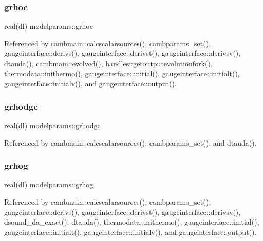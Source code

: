 \mbox{\label{namespacemodelparams_ae9f905639d83dffafeac77f6c039c632}} 
\subsubsection{\texorpdfstring{grhoc}{grhoc}}
{\footnotesize\ttfamily real(dl) modelparams\+::grhoc}



Referenced by cambmain\+::calcscalarsources(), cambparams\+\_\+set(), gaugeinterface\+::derivs(), gaugeinterface\+::derivst(), gaugeinterface\+::derivsv(), dtauda(), cambmain\+::evolved(), handles\+::getoutputevolutionfork(), thermodata\+::inithermo(), gaugeinterface\+::initial(), gaugeinterface\+::initialt(), gaugeinterface\+::initialv(), and gaugeinterface\+::output().

\mbox{\label{namespacemodelparams_a2cf17001b748d255082420e5cdcb52be}} 
\subsubsection{\texorpdfstring{grhodgc}{grhodgc}}
{\footnotesize\ttfamily real(dl) modelparams\+::grhodgc}



Referenced by cambmain\+::calcscalarsources(), cambparams\+\_\+set(), and dtauda().

\mbox{\label{namespacemodelparams_adcca33df63a9b35b19c2f220028498b1}} 
\subsubsection{\texorpdfstring{grhog}{grhog}}
{\footnotesize\ttfamily real(dl) modelparams\+::grhog}



Referenced by cambmain\+::calcscalarsources(), cambparams\+\_\+set(), gaugeinterface\+::derivs(), gaugeinterface\+::derivst(), gaugeinterface\+::derivsv(), dsound\+\_\+da\+\_\+exact(), dtauda(), thermodata\+::inithermo(), gaugeinterface\+::initial(), gaugeinterface\+::initialt(), gaugeinterface\+::initialv(), and gaugeinterface\+::output().

